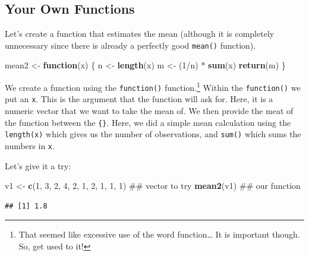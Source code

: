 \documentclass[]{tufte-book}
\newenvironment{Shaded}{}{}
\newcommand{\KeywordTok}[1]{\textcolor[rgb]{0.00,0.44,0.13}{\textbf{#1}}}
\newcommand{\DecValTok}[1]{\textcolor[rgb]{0.25,0.63,0.44}{#1}}
\newcommand{\StringTok}[1]{\textcolor[rgb]{0.25,0.44,0.63}{#1}}
\newcommand{\ControlFlowTok}[1]{\textcolor[rgb]{0.00,0.44,0.13}{\textbf{#1}}}
\newcommand{\OperatorTok}[1]{\textcolor[rgb]{0.40,0.40,0.40}{#1}}
\newcommand{\NormalTok}[1]{#1}
\theoremstyle{definition}
\theoremstyle{definition}
\theoremstyle{remark}
\begin{document}
\subsection*{Your Own Functions}\label{your-own-functions}

Let's create a function that estimates the mean (although it is
completely unnecessary since there is already a perfectly good
\texttt{mean()} function).

\begin{Shaded}
\begin{Highlighting}[]
\NormalTok{mean2 <-}\StringTok{ }\ControlFlowTok{function}\NormalTok{(x) \{}
\NormalTok{    n <-}\StringTok{ }\KeywordTok{length}\NormalTok{(x)}
\NormalTok{    m <-}\StringTok{ }\NormalTok{(}\DecValTok{1}\OperatorTok{/}\NormalTok{n) }\OperatorTok{*}\StringTok{ }\KeywordTok{sum}\NormalTok{(x)}
    \KeywordTok{return}\NormalTok{(m)}
\NormalTok{\}}
\end{Highlighting}
\end{Shaded}

We create a function using the \texttt{function()} function.\footnote{That
  seemed like excessive use of the word function\ldots{} It is important
  though. So, get used to it!} Within the \texttt{function()} we put an
\texttt{x}. This is the argument that the function will ask for. Here,
it is a numeric vector that we want to take the mean of. We then provide
the meat of the function between the \texttt{\{\}}. Here, we did a
simple mean calculation using the \texttt{length(x)} which gives us the
number of observations, and \texttt{sum()} which sums the numbers in
\texttt{x}.

Let's give it a try:

\begin{Shaded}
\begin{Highlighting}[]
\NormalTok{v1 <-}\StringTok{ }\KeywordTok{c}\NormalTok{(}\DecValTok{1}\NormalTok{, }\DecValTok{3}\NormalTok{, }\DecValTok{2}\NormalTok{, }\DecValTok{4}\NormalTok{, }\DecValTok{2}\NormalTok{, }\DecValTok{1}\NormalTok{, }\DecValTok{2}\NormalTok{, }\DecValTok{1}\NormalTok{, }\DecValTok{1}\NormalTok{, }\DecValTok{1}\NormalTok{)  ## vector to try}
\KeywordTok{mean2}\NormalTok{(v1)  ## our function}
\end{Highlighting}
\end{Shaded}

\begin{verbatim}
## [1] 1.8
\end{verbatim}
\end{document}
